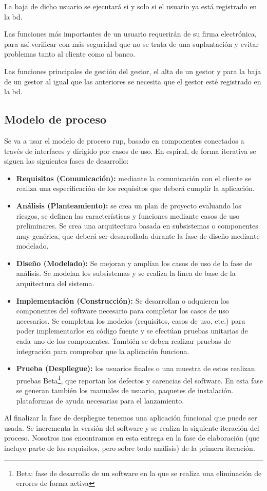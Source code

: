 \noindent La baja de dicho usuario se ejecutará si y solo si el usuario ya está registrado en la \gls{bd}.

Las funciones más importantes de un usuario requerirán de su firma electrónica, para así verificar con más seguridad que no se trata de una suplantación y evitar problemas tanto al cliente como al banco.

Las funciones principales de gestión del gestor, el alta de un gestor y para la baja de un gestor al igual que las anteriores se necesita que el gestor esté registrado en la \gls{bd}.

\subsection{Modelo de proceso}
Se va a usar el modelo de proceso \gls{rup}, basado en componentes conectados a través de interfaces y dirigido por casos de uso. En espiral, de forma iterativa se siguen las siguientes fases de desarrollo:
\begin{itemize}
	\item\textbf{Requisitos (Comunicación):} mediante la comunicación con el cliente se realiza una especificación de los requisitos que deberá cumplir la aplicación.
	\item\textbf{Análisis (Planteamiento):} se crea un plan de proyecto evaluando los riesgos, se definen las características y funciones mediante casos de uso preliminares. Se crea una arquitectura basada en subsistemas o componentes muy genérica, que deberá ser desarrollada durante la fase de diseño mediante modelado.
	\item\textbf{Diseño (Modelado):} Se mejoran y amplían los casos de uso de la fase de análisis. Se modelan los subsistemas y se realiza la línea de base de la arquitectura del sistema.
	\item\textbf{Implementación (Construcción): }Se desarrollan o adquieren los componentes del software necesario para completar los casos de uso necesarios. Se completan los modelos (requisitos, casos de uso, etc.) para poder implementarlos en código fuente y se efectúan pruebas unitarias de cada uno de los componentes. También se deben realizar pruebas de integración para comprobar que la aplicación funciona.
	\item\textbf{Prueba (Despliegue):} los usuarios finales o una muestra de estos realizan pruebas Beta\footnote{Beta: fase de desarrollo de un software en la que se realiza una eliminación de errores de forma activa}, que reportan los defectos y carencias del software. En esta fase se generan también los manuales de usuario, paquetes de instalación. plataformas de ayuda necesarias para el lanzamiento.
\end{itemize}

Al finalizar la fase de despliegue tenemos una aplicación funcional que puede ser usada. Se incrementa la versión del software y se realiza la siguiente iteración del proceso. Nosotros nos encontramos en esta entrega en la fase de elaboración (que incluye parte de los requisitos, pero sobre todo análisis) de la primera iteración.
